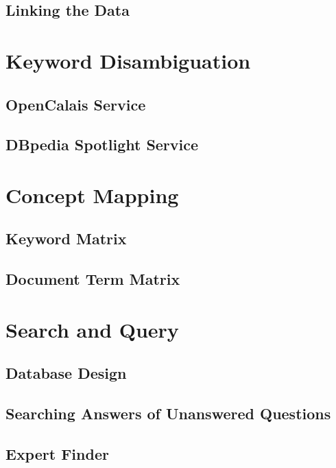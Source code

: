 \subsection{Linking the Data}

\section{Keyword Disambiguation}
\subsection{OpenCalais Service}
\subsection{DBpedia Spotlight Service}

\section{Concept Mapping}
\subsection{Keyword Matrix}
\subsection{Document Term Matrix}

\section{Search and Query}
\subsection{Database Design}
\subsection{Searching Answers of Unanswered Questions}
\subsection{Expert Finder}